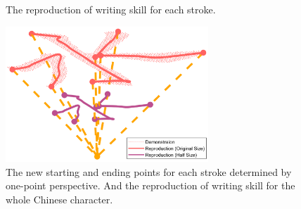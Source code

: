 \documentclass[conference]{IEEEtran}
\begin{document}
\begin{figure}[!t]
    \centering
    \quad
    \caption{The reproduction of writing skill for each stroke.}
    \label{fig6}
\end{figure}

\begin{figure}[!t]
    \centering
    \includegraphics[width=3in]{./fig/fig7.pdf}
    \caption{The new starting and ending points for each stroke determined by one-point perspective. And the reproduction of writing skill for the whole Chinese character.}
    \label{fig7}
\end{figure}
\end{document}
